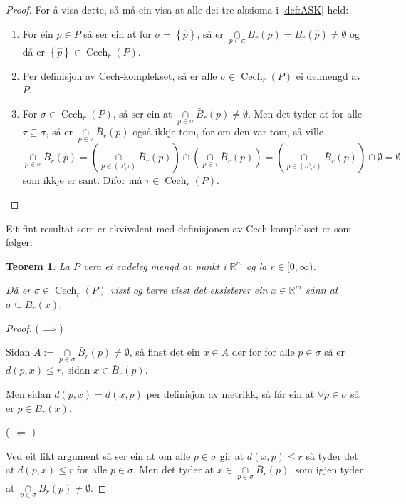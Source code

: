 \documentclass[a4paper, 12pt, norsk]{article}
\theoremstyle{plain}
\newtheorem{theorem}{Teorem}[section]
\theoremstyle{definition}
\newcommand{\Rb}{\mathbb{R}}
\newcommand{\intersect}{ \mathop{\cap}\limits }
\newcommand{\set}[1]{ \left\{ #1 \right\} } %
\DeclareMathOperator{\Cech}{Cech} %
\begin{document}
\begin{proof}
	For å visa dette, så må ein visa at alle dei tre aksioma i \autoref{def:ASK} held:
	\begin{enumerate}
		\item{ For ein \( \hat{p} \in P \) så ser ein at for \( \sigma = \set{\hat{p}} \), så er \( \intersect_{p\in\sigma}\bar{B}_r(p)=\bar{B}_r(\hat{p})\neq\emptyset \) og då er \( \set{\hat{p}} \in \Cech_r(P) \). }
		\item{ Per definisjon av Cech-komplekset, så er alle \( \sigma \in \Cech_r(P) \) ei delmengd av \( P \). }
		\item{ For \( \sigma \in \Cech_r(P) \), så ser ein at \( \intersect_{p\in\sigma} \bar{B}_r(p) \neq \emptyset \). Men det tyder at for alle \( \tau \subseteq \sigma \), så er \( \intersect_{p\in\tau} \bar{B}_r(p) \) også ikkje-tom, for om den var tom, så ville
			\[ 
				\intersect_{p\in\sigma} \bar{B}_r(p) = \left( \intersect_{p\in(\sigma\setminus\tau)} \bar{B}_r(p) \right) \intersect \left( \intersect_{p\in\tau} \bar{B}_r(p) \right) = \left( \intersect_{p\in(\sigma\setminus\tau)} \bar{B}_r(p) \right) \intersect \emptyset = \emptyset 
			\] 
			som ikkje er sant. Difor må \( \tau \in \Cech_r(P) \). }
	\end{enumerate}
\end{proof}

Eit fint resultat som er ekvivalent med definisjonen av Cech-komplekset er som følger:

\begin{theorem}
	La $P$ vera ei endeleg mengd av punkt i $\Rb^m$ og la $r\in[0, \infty)$.

	Då er \( \sigma \in \Cech_r(P) \) visst og berre visst det eksisterer ein \( x \in \Rb^m \) sånn at \( \sigma \subseteq \bar{B}_r(x) \).
\end{theorem}

\begin{proof}
	($\implies$)
	
	Sidan $A:=\intersect_{p\in\sigma}\bar{B}_r(p)\neq\emptyset$, så finst det ein $x\in A$ der for for alle \( p\in\sigma \) så er \( d(p,x)\leq r \), sidan $x\in\bar{B}_r(p)$.
	
	Men sidan $d(p,x)=d(x,p)$ per definisjon av metrikk, så får ein at \( \forall p\in\sigma \) så er \( p \in \bar{B}_r(x) \).
	
	( \( \Longleftarrow \) )
	
	Ved eit likt argument så ser ein at om alle \( p \in \sigma \) gir at \( d(x, p) \leq r \) så tyder det at \( d(p, x) \leq r \) for alle \( p \in \sigma \). Men det tyder at \( x \in \intersect_{p \in \sigma} \bar{B}_r(p) \), som igjen tyder at \( \intersect_{p \in \sigma} \bar{B}_r(p) \neq \emptyset \).
\end{proof}
\end{document}
